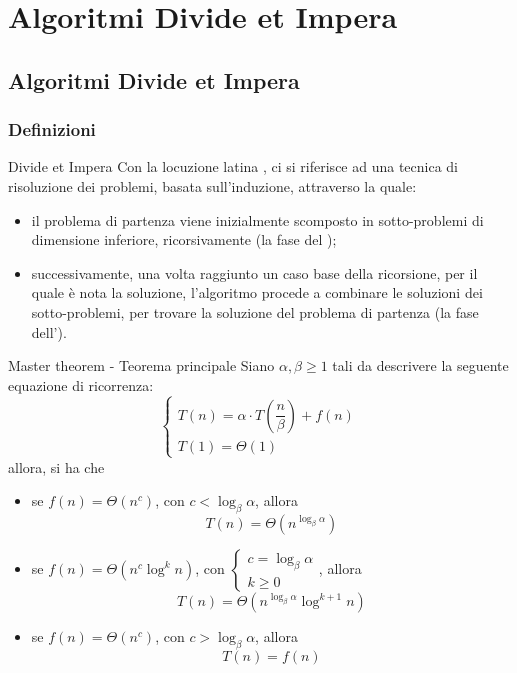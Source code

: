 \documentclass[a4paper, 12pt]{report}
\begin{document}
    \chapter{Algoritmi Divide et Impera}

    \section{Algoritmi Divide et Impera}

    \subsection{Definizioni}

    \begin{frameddefn}{Divide et Impera}
        Con la locuzione latina , ci si riferisce ad una tecnica di risoluzione dei problemi, basata sull'induzione, attraverso la quale:

        \begin{itemize} 
            \item il problema di partenza viene inizialmente scomposto in sotto-problemi di dimensione inferiore, ricorsivamente (la fase del );
            \item successivamente, una volta raggiunto un caso base della ricorsione, per il quale è nota la soluzione, l'algoritmo procede a combinare le soluzioni dei sotto-problemi, per trovare la soluzione del problema di partenza (la fase dell').
        \end{itemize}
    \end{frameddefn}

    \begin{framedthm}[label={master theorem},breakable]{Master theorem - Teorema principale}
        Siano $\alpha, \beta \ge 1$ tali da descrivere la seguente equazione di ricorrenza: $$\left \{ \begin{array}{l} T(n) = \alpha \cdot T\left(\dfrac{n}{\beta}\right) + f(n) \\ T(1) = \Theta(1) \end{array} \right.$$ allora, si ha che
        \begin{itemize}
            \item se $f(n) = \Theta(n^c)$, con $c < \log_{\beta}{\alpha}$, allora $$T(n) = \Theta(n^{\log_{\beta}{\alpha}})$$
            \item se $f(n) = \Theta(n^c \log^k n)$, con $\left \{ \begin{array}{l} c = \log_{\beta}{\alpha} \\ k \ge 0 \end{array} \right.$, allora $$T(n) = \Theta(n^{\log_{\beta}{\alpha}} \log^{k+1} {n})$$
            \item se $f(n) = \Theta(n^c)$, con $c > \log_{\beta}{\alpha}$, allora $$T(n) = f(n)$$
        \end{itemize}
    \end{framedthm}
\end{document}
